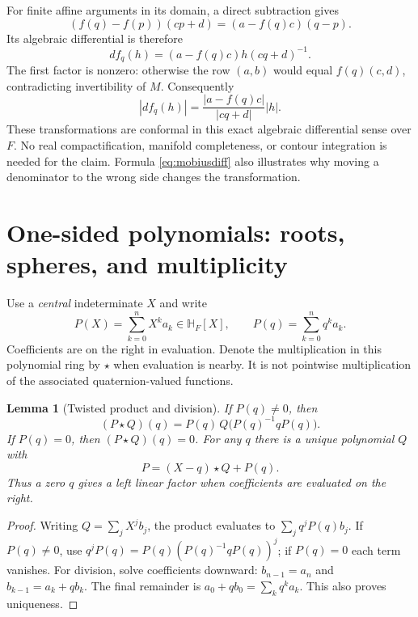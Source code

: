 \documentclass[11pt,letterpaper]{article}
\numberwithin{equation}{section}
\newtheorem{lemma}[lemma]{Lemma}
\theoremstyle{definition}
\theoremstyle{remark}
\newcommand{\HF}{\mathbb H_F}
\begin{document}
For finite affine arguments in its domain, a direct subtraction gives
\begin{equation}\label{eq:mobiusdiff}
 (f(q)-f(p))(cp+d)=(a-f(q)c)(q-p).
\end{equation}
Its algebraic differential is therefore
\[
 df_q(h)=(a-f(q)c)h(cq+d)^{-1}.
\]
The first factor is nonzero: otherwise the row $(a,b)$ would equal $f(q)(c,d)$, contradicting
invertibility of $M$. Consequently
\[
 |df_q(h)|=\frac{|a-f(q)c|}{|cq+d|}|h|.
\]
These transformations are conformal in this exact algebraic differential sense over $F$.
No real compactification, manifold completeness, or contour integration is needed for the
claim. Formula \eqref{eq:mobiusdiff} also illustrates why moving a denominator to the wrong
side changes the transformation.

\section{One-sided polynomials: roots, spheres, and multiplicity}\label{sec:polynomials}

Use a \emph{central} indeterminate $X$ and write
\[
 P(X)=\sum_{k=0}^nX^k a_k\in\HF[X],\qquad
 P(q)=\sum_{k=0}^nq^k a_k.
\]
Coefficients are on the right in evaluation. Denote the multiplication in this polynomial
ring by $\star$ when evaluation is nearby. It is not pointwise multiplication of the
associated quaternion-valued functions.

\begin{lemma}[Twisted product and division]\label{lem:twisted}
If $P(q)\ne0$, then
\begin{equation}\label{eq:twisted}
 (P\star Q)(q)=P(q)\,Q\bigl(P(q)^{-1}qP(q)\bigr).
\end{equation}
If $P(q)=0$, then $(P\star Q)(q)=0$. For any $q$ there is a unique polynomial $Q$ with
\begin{equation}\label{eq:leftdivision}
 P=(X-q)\star Q+P(q).
\end{equation}
Thus a zero $q$ gives a \emph{left} linear factor when coefficients are evaluated on the right.
\end{lemma}
\begin{proof}
Writing $Q=\sum_jX^jb_j$, the product evaluates to
$\sum_jq^jP(q)b_j$. If $P(q)\ne0$, use
$q^jP(q)=P(q)(P(q)^{-1}qP(q))^j$; if $P(q)=0$ each term vanishes.
For division, solve coefficients downward: $b_{n-1}=a_n$ and
$b_{k-1}=a_k+qb_k$. The final remainder is
$a_0+qb_0=\sum_kq^ka_k$. This also proves uniqueness.
\end{proof}
\end{document}
